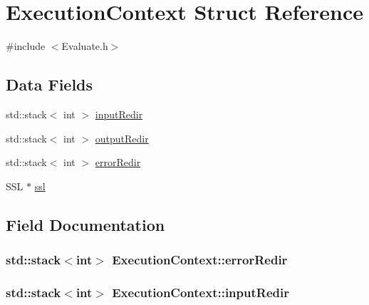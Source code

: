 \hypertarget{structExecutionContext}{}\section{Execution\+Context Struct Reference}
\label{structExecutionContext}


{\ttfamily \#include $<$Evaluate.\+h$>$}

\subsection*{Data Fields}
\begin{DoxyCompactItemize}
\item 
std\+::stack$<$ int $>$ \hyperlink{structExecutionContext_a33562118feda5571fe0ba87186670679}{input\+Redir}
\item 
std\+::stack$<$ int $>$ \hyperlink{structExecutionContext_a15af12d7e8146ae1a5f091b7d9919c8c}{output\+Redir}
\item 
std\+::stack$<$ int $>$ \hyperlink{structExecutionContext_aa5d29389a31755f8a0c1099f7c7768bf}{error\+Redir}
\item 
S\+SL $\ast$ \hyperlink{structExecutionContext_afce3bfa5f05214b9b0d57ac1edb0a0f4}{ssl}
\end{DoxyCompactItemize}


\subsection{Field Documentation}
\subsubsection[{\texorpdfstring{error\+Redir}{errorRedir}}]{\setlength{\rightskip}{0pt plus 5cm}std\+::stack$<$int$>$ Execution\+Context\+::error\+Redir}\hypertarget{structExecutionContext_aa5d29389a31755f8a0c1099f7c7768bf}{}\label{structExecutionContext_aa5d29389a31755f8a0c1099f7c7768bf}
\subsubsection[{\texorpdfstring{input\+Redir}{inputRedir}}]{\setlength{\rightskip}{0pt plus 5cm}std\+::stack$<$int$>$ Execution\+Context\+::input\+Redir}\hypertarget{structExecutionContext_a33562118feda5571fe0ba87186670679}{}\label{structExecutionContext_a33562118feda5571fe0ba87186670679}
